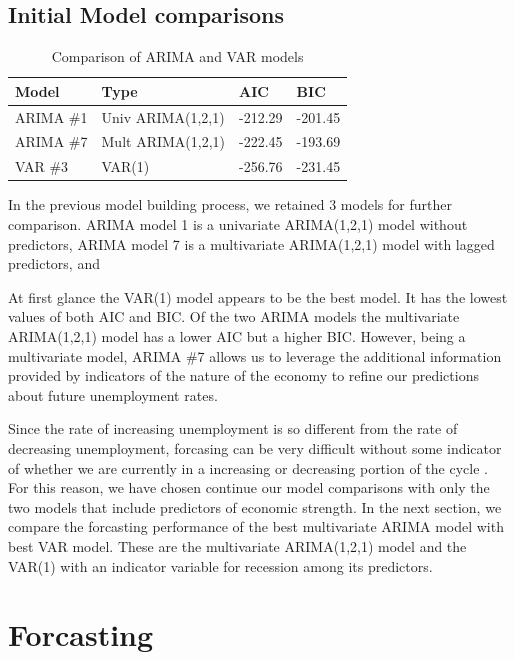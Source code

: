 \documentclass[twoside,twocolumn]{article}
\begin{document}
\subsection{Initial Model comparisons}

\begin{table}[H]
\centering
\caption{Comparison of ARIMA and VAR models}
\begin{tabular}{llll}
  \hline
Model & Type & AIC & BIC \\ 
  \hline
ARIMA \#1 &Univ ARIMA(1,2,1) &   -212.29 & -201.45  \\ 
ARIMA \#7 & Mult ARIMA(1,2,1)  & -222.45 & -193.69   \\ 
VAR \#3 & VAR(1) & -256.76 & -231.45 \\ 
   \hline
\end{tabular}
\end{table}


In the previous model building process, we retained 3 models for further comparison. ARIMA model 1 is a univariate ARIMA(1,2,1) model without predictors, ARIMA model 7 is a multivariate ARIMA(1,2,1) model with lagged predictors, and 

At first glance the VAR(1) model appears to be the best model.  It has the lowest values of both AIC and BIC.  Of the two ARIMA models the multivariate ARIMA(1,2,1) model has a lower AIC but a higher BIC. However, being a multivariate model, ARIMA \#7 allows us to leverage the additional information provided by indicators of the nature of the economy to refine our predictions about future unemployment rates. 

Since the rate of increasing unemployment is so different from the rate of decreasing unemployment, forcasing can be very difficult without some indicator of whether we are currently in a increasing or decreasing portion of the cycle \citep{Montgomery1998}. For this reason, we have chosen continue our model comparisons with only the two models that include predictors of economic strength. In the next section, we compare the forcasting performance of the best multivariate ARIMA model with best VAR model. These are the multivariate ARIMA(1,2,1) model and the VAR(1) with an indicator variable for recession among its predictors.


\section{Forcasting}
\end{document}
